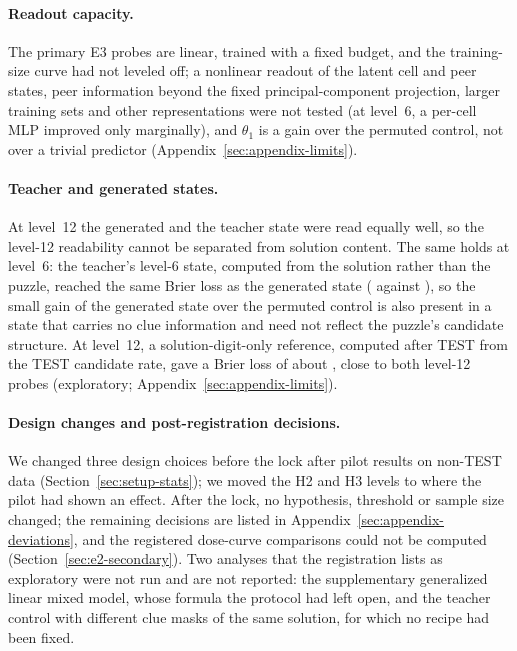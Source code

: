 \paragraph{Readout capacity.} The primary E3 probes are linear, trained with a fixed budget, and the training-size curve had not leveled off; a nonlinear readout of the latent cell and peer states, peer information beyond the fixed principal-component projection, larger training sets and other representations were not tested (at level~6, a per-cell MLP improved only marginally), and $\theta_1$ is a gain over the permuted control, not over a trivial predictor (Appendix~\ref{sec:appendix-limits}).

\paragraph{Teacher and generated states.} At level~12 the generated and the teacher state were read equally well, so the level-12 readability cannot be separated from solution content. The same holds at level~6: the teacher's level-6 state, computed from the solution rather than the puzzle, reached the same Brier loss as the generated state ( against ), so the small gain of the generated state over the permuted control is also present in a state that carries no clue information and need not reflect the puzzle's candidate structure. At level~12, a solution-digit-only reference, computed after TEST from the TEST candidate rate, gave a Brier loss of about , close to both level-12 probes (exploratory; Appendix~\ref{sec:appendix-limits}).

\paragraph{Design changes and post-registration decisions.} We changed three design choices before the lock after pilot results on non-TEST data (Section~\ref{sec:setup-stats}); we moved the H2 and H3 levels to where the pilot had shown an effect. After the lock, no hypothesis, threshold or sample size changed; the remaining decisions are listed in Appendix~\ref{sec:appendix-deviations}, and the registered dose-curve comparisons could not be computed (Section~\ref{sec:e2-secondary}). Two analyses that the registration lists as exploratory were not run and are not reported: the supplementary generalized linear mixed model, whose formula the protocol had left open, and the teacher control with different clue masks of the same solution, for which no recipe had been fixed.

